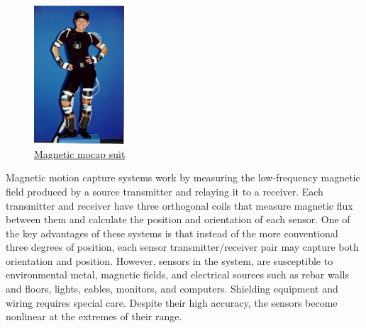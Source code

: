 \begin{figure}[h]
	\centering
	\includegraphics[width=0.3\textwidth]{figures/background/Magnetic.png}
	\captionsetup{labelformat=empty}
	\caption{\href{https://www.researchgate.net/profile/Jessica-Hodgins-2/publication/2359279/figure/fig4/AS:669524957331457@1536638597171/A-performer-wearing-a-motion-capture-apparatus-The-device-shown-is-a-full-body-magnetic.ppm}
	{Magnetic mocap suit}}
\end{figure}

Magnetic motion capture systems \cite{MOTION CAPTURE TO BUILD A FOUNDATION FOR A COMPUTER-CONTROLLED INSTRUMENT BY STUDY OF CLASSICAL GUITAR PERFORMANCE} work by measuring the low-frequency magnetic field produced by a source transmitter and relaying it to a receiver. Each transmitter and receiver have three orthogonal coils that measure magnetic flux between them and calculate the position and orientation of each sensor. One of the key advantages of these systems is that instead of the more conventional three degrees of position, each sensor transmitter/receiver pair may capture both orientation and position. However, sensors in the system, are susceptible to environmental metal, magnetic fields, and electrical sources such as rebar walls and floors, lights, cables, monitors, and computers. Shielding equipment and wiring requires special care. Despite their high accuracy, the sensors become nonlinear at the extremes of their range.